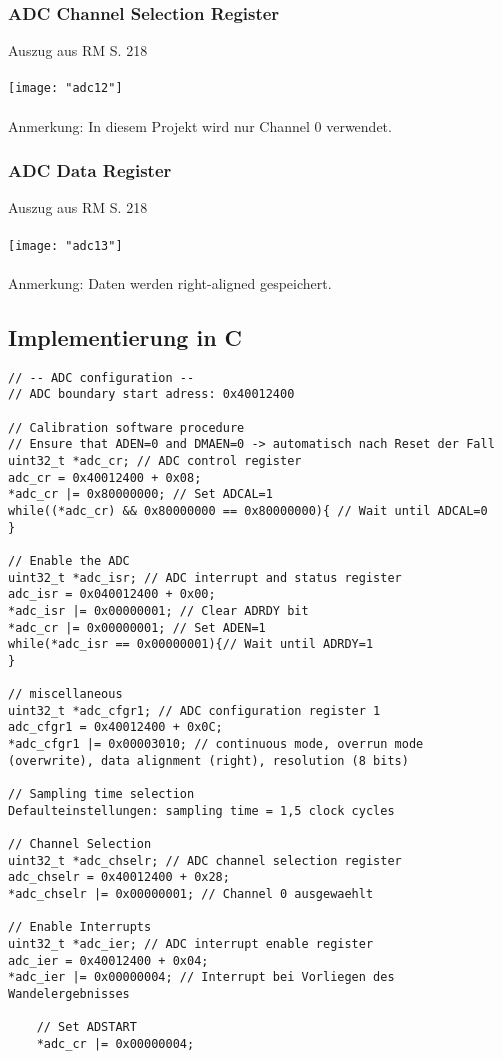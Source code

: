 \documentclass[11pt]{report}
\begin{document}
			\subsubsection{ADC Channel Selection Register}
				Auszug aus RM S. 218\\
				\\\texttt{[image: "adc12"]}\\
				\\Anmerkung: In diesem Projekt wird nur Channel 0 verwendet.
			\subsubsection{ADC Data Register}
				Auszug aus RM S. 218\\
				\\\texttt{[image: "adc13"]}\\
				\\Anmerkung: Daten werden right-aligned gespeichert.
		\subsection{Implementierung in C}
			\begin{lstlisting}
// -- ADC configuration --
// ADC boundary start adress: 0x40012400

// Calibration software procedure
// Ensure that ADEN=0 and DMAEN=0 -> automatisch nach Reset der Fall
uint32_t *adc_cr; // ADC control register
adc_cr = 0x40012400 + 0x08;
*adc_cr |= 0x80000000; // Set ADCAL=1
while((*adc_cr) && 0x80000000 == 0x80000000){ // Wait until ADCAL=0
}

// Enable the ADC
uint32_t *adc_isr; // ADC interrupt and status register
adc_isr = 0x040012400 + 0x00;
*adc_isr |= 0x00000001; // Clear ADRDY bit
*adc_cr |= 0x00000001; // Set ADEN=1
while(*adc_isr == 0x00000001){// Wait until ADRDY=1
}

// miscellaneous
uint32_t *adc_cfgr1; // ADC configuration register 1
adc_cfgr1 = 0x40012400 + 0x0C;
*adc_cfgr1 |= 0x00003010; // continuous mode, overrun mode (overwrite), data alignment (right), resolution (8 bits)

// Sampling time selection
Defaulteinstellungen: sampling time = 1,5 clock cycles

// Channel Selection
uint32_t *adc_chselr; // ADC channel selection register
adc_chselr = 0x40012400 + 0x28;
*adc_chselr |= 0x00000001; // Channel 0 ausgewaehlt

// Enable Interrupts
uint32_t *adc_ier; // ADC interrupt enable register
adc_ier = 0x40012400 + 0x04;
*adc_ier |= 0x00000004; // Interrupt bei Vorliegen des Wandelergebnisses

	// Set ADSTART
	*adc_cr |= 0x00000004;
			\end{lstlisting}
\end{document}
